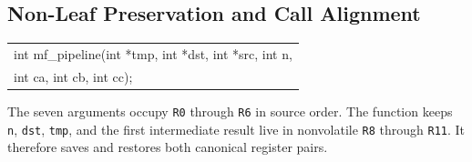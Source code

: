 \documentclass[10pt,twoside]{article}
\begin{document}
\subsection{Non-Leaf Preservation and Call Alignment}
\begingroup\small\ttfamily
\begin{tabularx}{\linewidth}{@{}X@{}}
int mf\_pipeline(int *tmp, int *dst, int *src, int n,\tabularnewline
\hspace{1.2em}int ca, int cb, int cc);\tabularnewline
\end{tabularx}
\endgroup

The seven arguments occupy \texttt{R0} through \texttt{R6} in source order.
The function keeps \texttt{n}, \texttt{dst}, \texttt{tmp}, and the
first intermediate result live in nonvolatile \texttt{R8} through
\texttt{R11}. It therefore saves and restores both canonical register pairs.
\end{document}
